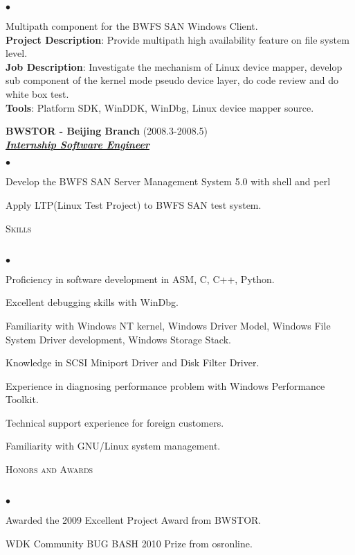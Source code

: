 \documentclass{article}
\newcommand{\lineunder}{\vspace*{-8pt} \\ \hspace*{-18pt} \hrulefill \\}
\newcommand{\header}[1]{{\hspace*{-15pt}\vspace*{6pt} \textsc{#1}} \vspace*{-6pt} \lineunder}
\newcommand{\employer}[3]{{ \textbf{#1} (#2)\\ \underline{\textbf{\emph{#3}}}\\}}
\newcommand{\project}[4]{{#1}\\ \textbf{Project Description}:
  {#2}\\ \textbf{Job Description}: {#3}\\ \textbf{Tools}: {#4}\vspace*{3pt}}
\newenvironment{achievements}{\begin{list}{$\bullet$}{\topsep 0pt \itemsep -2pt}}{\vspace*{6pt}\end{list}}
\begin{document}
\begin{achievements}
\item 
  \project{Multipath component for the BWFS SAN Windows Client.}
          {Provide multipath high availability feature on file system level.}
          {Investigate the mechanism of Linux device mapper, develop sub component of the kernel mode pseudo device layer, do code review and do white box test.}
          {Platform SDK, WinDDK, WinDbg, Linux device mapper source.}

\end{achievements}

\employer{BWSTOR - Beijing Branch}{2008.3-2008.5}{Internship Software Engineer}
\begin{achievements}
\item Develop the BWFS SAN Server Management System 5.0 with shell and perl
\item Apply LTP(Linux Test Project) to BWFS SAN test system.
\end{achievements}


\header{Skills}
\begin{achievements}
\item Proficiency in software development in ASM, C, C++, Python.
\item Excellent debugging skills with WinDbg.
\item Familiarity with Windows NT kernel, Windows Driver Model,
  Windows File System Driver development, Windows Storage Stack.
\item Knowledge in SCSI Miniport Driver and Disk Filter Driver.
\item Experience in diagnosing performance problem with Windows
  Performance Toolkit.
\item Technical support experience for foreign customers.
\item Familiarity with GNU/Linux system management.
\end{achievements}


\header{Honors and Awards}
\begin{achievements}
\item Awarded the 2009 Excellent Project Award from BWSTOR.
\item WDK Community BUG BASH 2010 Prize from osronline.
\end{achievements}
\end{document}
